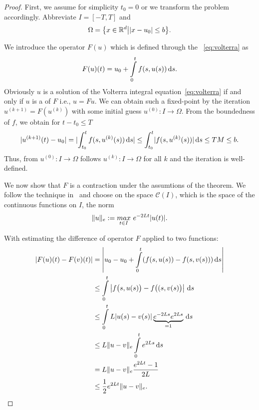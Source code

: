 \begin{proof}
  First, we assume for simplicity $t_0=0$ or we transform the problem
  accordingly. Abbreviate $I = [-T,T]$ and
  \begin{gather*}
    \Omega = \bigl\{x\in \mathbb R^d\big| \lvert x-u_0\rvert \le b \bigr\}.
  \end{gather*}

  We introduce the operator $F(u)$ which is defined
  through the ~\eqref{eq:volterra} as
  \begin{gather}
    \label{eq:IVP:16}
   F(u)(t) = u_0 + \int\limits_{0}^t f(s,u(s)) \,\mathrm{d} s.
  \end{gather}
  Obviously $u$ is a solution of the Volterra integral
  equation~\eqref{eq:volterra} if and only if $u$ is a  of $F$ i.e., $u=Fu$. We can obtain such a fixed-point by
  the iteration $u^{(k+1)} = F(u^{(k)})$ with some initial guess
  $u^{(0)}:I\to\Omega$. From the boundedness of $f$, we obtain for
  $t-t_0 \le T$
  \begin{align*}
    \abs{u^{(k+1)}(t)-u_0} = \abs[big]{\int_{t_0}^t f(s,u^{(k)}(s))\ds } \le \int_{t_0}^t
    \abs{f(s,u^{(k)}(s))}\ds \le TM \le b.
  \end{align*}
  Thus, from $u^{(0)}:I\to\Omega$ follows $u^{(k)}:I\to\Omega$ for all
  $k$ and the iteration is well-defined.
  
  We now show that $F$ is a contraction under the assumtions of the
  theorem. We follow the technique
  in~\cite[\S117]{Heuser86} and choose on the space $\mathcal C(I)$,
  which is the space of the continuous functions on $I$, the norm
  \begin{gather*}
    \lVert u\rVert_e := \underset{t \in I}{max} ~e^{-2 L t} |u(t)|.
  \end{gather*}
  
  With estimating the difference of operator $F$ applied to two functions:
  \begin{align*}
    |F(u)(t) - F(v)(t)|
    & = \left| u_0 - u_0 + \int\limits_{0}^t (f(s,u(s)) - f(s,v(s))) \,\mathrm{d} s \right| \\
    & \le \int\limits_{0}^t \left| f\bigl(s,u(s)\bigr) - f\bigl((s,v(s)\bigr) \right| \,\mathrm{d} s \\
    & \le \int\limits_{0}^t L |u(s) - v(s)| \underbrace{e^{-2 L s} e^{2 L s}}_{= 1} \,\mathrm{d} s \\
    & \le L \lVert u-v\rVert_e \int\limits_{0}^t e^{2 L s} \,\mathrm{d} s \\
    & = L \lVert u-v\rVert_e \frac{e^{2 L t} - 1}{2 L} \\
    & \le \frac12 e^{2 L t} \lVert u-v\rVert_e.
  \end{align*}


\end{proof}
